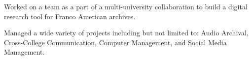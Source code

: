 \documentclass[letterpaper]{AMcEnaneyResume} %
\begin{document}
\begin{minipage}[t]{0.66\textwidth}
        \sectionspace %




        \begin{tightitemize}
            \item Worked on a team as a part of a multi-university collaboration to build a digital research tool for Franco American archives.
            \item Managed a wide variety of projects including but not limited to: Audio Archival, Cross-College Communication, Computer Management, and Social Media Management.
        \end{tightitemize}

        \sectionspace %
        


\end{minipage} %
\end{document}

